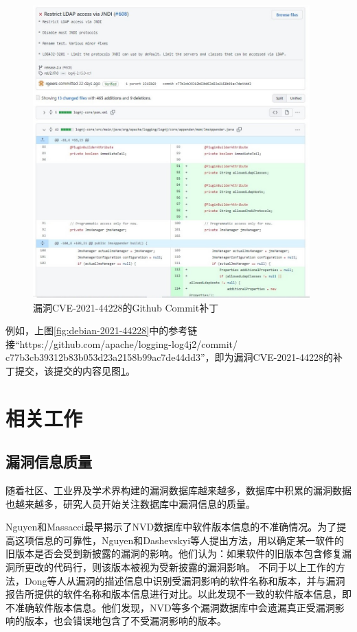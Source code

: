 \begin{figure}[!t]
    \centering
    \includegraphics[width=0.95\textwidth]{fig/commit-2021-44228}
    \caption{漏洞CVE-2021-44228的Github Commit补丁}
    \label{fig:commit-2021-44228}
\end{figure}

例如，上图\ref{fig:debian-2021-44228}中的参考链接“https://github.com/apache/logging-log4j2/commit/\\c77b3cb39312b83b053d23a2158b99ac7de44dd3”，即为漏洞CVE-2021-44228的补丁提交，该提交的内容见图\ref{fig:commit-2021-44228}。


\section{相关工作}
\subsection{漏洞信息质量}
随着社区、工业界及学术界构建的漏洞数据库越来越多，数据库中积累的漏洞数据也越来越多，研究人员开始关注数据库中漏洞信息的质量。

Nguyen和Massacci\cite{nguyen2013reliability}最早揭示了NVD数据库中软件版本信息的不准确情况。为了提高这项信息的可靠性，Nguyen\cite{nguyen2016automatic}和Dashevskyi等人\cite{dashevskyi2018screening}提出方法，用以确定某一软件的旧版本是否会受到新披露的漏洞的影响。他们认为：如果软件的旧版本包含修复漏洞所更改的代码行，则该版本被视为受新披露的漏洞影响。
不同于以上工作的方法，Dong等人\cite{dong2019towards}从漏洞的描述信息中识别受漏洞影响的软件名称和版本，并与漏洞报告所提供的软件名称和版本信息进行对比。以此发现不一致的软件版本信息，即不准确软件版本信息。他们发现，NVD等多个漏洞数据库中会遗漏真正受漏洞影响的版本，也会错误地包含了不受漏洞影响的版本。

